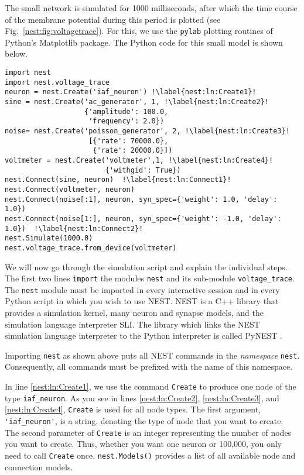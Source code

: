 \documentclass{article}
\begin{document}
The small network is simulated for 1000 milliseconds, after which the
time course of the membrane potential during this period is plotted
(see Fig.~\ref{nest:fig:voltagetrace}). For this, we use the
\lstinline!pylab! plotting routines of Python's Matplotlib package.
The Python code for this small model is shown below.

\begin{lstlisting}
import nest
import nest.voltage_trace
neuron = nest.Create('iaf_neuron') !\label{nest:ln:Create1}!
sine = nest.Create('ac_generator', 1, !\label{nest:ln:Create2}!
                   {'amplitude': 100.0,
                    'frequency': 2.0})
noise= nest.Create('poisson_generator', 2, !\label{nest:ln:Create3}!
                    [{'rate': 70000.0}, 
                     {'rate': 20000.0}])
voltmeter = nest.Create('voltmeter',1, !\label{nest:ln:Create4}!
                        {'withgid': True})
nest.Connect(sine, neuron)  !\label{nest:ln:Connect1}!
nest.Connect(voltmeter, neuron)
nest.Connect(noise[:1], neuron, syn_spec={'weight': 1.0, 'delay': 1.0}) 
nest.Connect(noise[1:], neuron, syn_spec={'weight': -1.0, 'delay': 1.0})  !\label{nest:ln:Connect2}!
nest.Simulate(1000.0)
nest.voltage_trace.from_device(voltmeter)
\end{lstlisting}
We will now go through the simulation script and explain the
individual steps. The first two lines \lstinline!import! the modules
\lstinline!nest!  and its sub-module \lstinline!voltage_trace!. The
\lstinline!nest!  module must be imported in every interactive session
and in every Python script in which you wish to use NEST. NEST is a
C++ library that provides a simulation kernel, many neuron and synapse
models, and the simulation language interpreter SLI. The library which
links the NEST simulation language interpreter to the Python
interpreter is called PyNEST \citep{Eppler09_12}. 

Importing \lstinline!nest! as shown above puts all NEST commands in
the \emph{namespace} \lstinline!nest!. Consequently, all commands must
be prefixed with the name of this namespace.
 
In line \ref{nest:ln:Create1}, we use the command \lstinline!Create!
to produce one node of the type \lstinline!iaf_neuron!. As you see in
lines \ref{nest:ln:Create2}, \ref{nest:ln:Create3}, and
\ref{nest:ln:Create4}, \lstinline!Create! is used for all node types.
The first argument, \lstinline!'iaf_neuron'!, is a string, denoting
the type of node that you want to create.
The second parameter of \lstinline!Create! is an integer representing
the number of nodes you want to create. Thus, whether you want one neuron
or 100,000, you only need to call \lstinline!Create! once.
\lstinline!nest.Models()! provides a list of all available node and
connection models.
\end{document}
